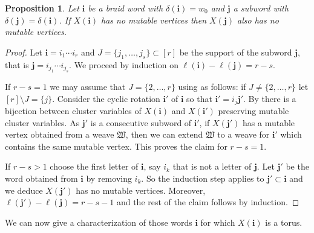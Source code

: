 \documentclass[a4paper, 11pt]{amsart}
\newcommand{\word}[1]{\mathbf{#1}}
\newtheorem{proposition}[theorem]{Proposition}%
\theoremstyle{definition}
\begin{document}
\begin{proposition}\label{prop:no mutables in subwords}
 Let $\word{i}$ be a braid word with $\delta(\word{i})=w_0$ and $\word{j}$ a subword with $\delta(\word{j})=\delta(\word{i})$. 
 If $X(\word{i})$ has no mutable vertices then $X(\word{j})$  also has no mutable vertices. 
\end{proposition}

\begin{proof}
Let $\word{i}={i_1}\cdots {i_r}$ and $J=\{j_1,\dots,j_s\}\subset[r]$ be the support of the subword $\word{j}$, that is $\word{j}={i_{j_1}}\cdots {i_{j_s}}$. 
We proceed by induction on $\ell(\word{i})-\ell(\word{j})=r-s$.

If $r-s=1$ we may assume that $J=\{2,\dots,r\}$ using \cite[\S5.5]{CGGLSS} as follows: if $J\not=\{2,\dots,r\}$ let $[r]\setminus J=\{j\}$. Consider the cyclic rotation $\word{i}'$ of $\word{i}$ so that $\word{i}'={i_j} \word{j}'$.
By \cite[Theorem 5.31]{CGGLSS} there is a bijection between cluster variables of $X(\word{i})$ and $X(\word{i}')$ preserving mutable cluster variables.
As $\word{j}'$ is a consecutive subword of $\word{i}'$, if $X(\word{j}')$ has a mutable vertex obtained from a weave $\mathfrak W$, then we can extend $\mathfrak W$ to a weave for $\word{i}'$ which contains the same mutable vertex. This proves the claim for $r-s=1$.

If $r-s>1$ choose the first letter of $\word{i}$, say ${i_k}$ that is not a letter of $\word{j}$. Let $\word{j}'$ be the word obtained from $\word{i}$ by removing ${i_k}$. So the induction step applies to $\word{j}'\subset\word{i}$ and we deduce $X(\word{j}')$ has no mutable vertices. Moreover, $\ell(\word{j}')-\ell(\word{j})=r-s-1$ and the rest of the claim follows by induction.
\end{proof}

We can now give a characterization of those words $\word{i}$ for which $X(\word{i})$ is a torus. 
\end{document}
